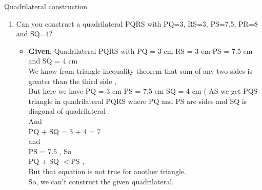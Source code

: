 \begin{frame}{Quadrilateral construction}
\begin{enumerate}
\conti
\item Can you construct a quadrilateral PQRS with PQ=3, RS=3, PS=7.5, PR=8 and SQ=4?\\
\begin{itemize}
\item \textbf{Given}:  Quadrilateral PQRS with PQ = 3 cm RS =  3 cm PS = 7.5 cm and SQ = 4 cm\\

We know from triangle inequality theorem that sum of any two sides is greater than the third side ,\\
But here we have PQ = 3 cm PS =  7.5 cm SQ = 4 cm ( AS we get PQS triangle in quadrilateral PQRS where PQ and PS are sides and SQ is diagonal of quadrilateral . \\

And\\

PQ + SQ = 3 + 4 = 7\\

and\\

PS = 7.5 , So\\

PQ + SQ $<$PS ,\\
 But that equation is not true for another triangle.\\
So, we can't construct the given quadrilateral.
\seti
\end{itemize}
\end{enumerate}
\end{frame}